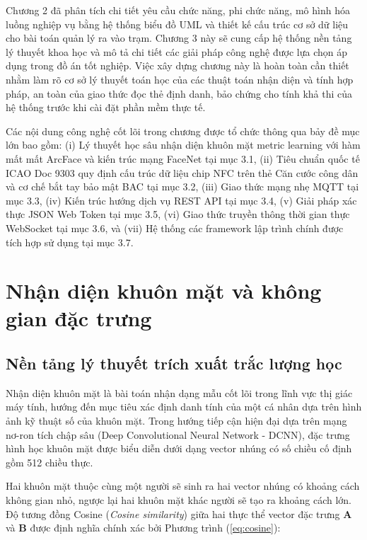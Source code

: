 ﻿\documentclass[../DoAn.tex]{subfiles}
\begin{document}
Chương 2 đã phân tích chi tiết yêu cầu chức năng, phi chức năng, mô hình hóa luồng nghiệp vụ bằng hệ thống biểu đồ UML và thiết kế cấu trúc cơ sở dữ liệu cho bài toán quản lý ra vào trạm. Chương 3 này sẽ cung cấp hệ thống nền tảng lý thuyết khoa học và mô tả chi tiết các giải pháp công nghệ được lựa chọn áp dụng trong đồ án tốt nghiệp. Việc xây dựng chương này là hoàn toàn cần thiết nhằm làm rõ cơ sở lý thuyết toán học của các thuật toán nhận diện và tính hợp pháp, an toàn của giao thức đọc thẻ định danh, bảo chứng cho tính khả thi của hệ thống trước khi cài đặt phần mềm thực tế. 

Các nội dung công nghệ cốt lõi trong chương được tổ chức thông qua bảy đề mục lớn bao gồm: (i) Lý thuyết học sâu nhận diện khuôn mặt metric learning với hàm mất mất ArcFace và kiến trúc mạng FaceNet tại mục 3.1, (ii) Tiêu chuẩn quốc tế ICAO Doc 9303 quy định cấu trúc dữ liệu chip NFC trên thẻ Căn cước công dân và cơ chế bắt tay bảo mật BAC tại mục 3.2, (iii) Giao thức mạng nhẹ MQTT tại mục 3.3, (iv) Kiến trúc hướng dịch vụ REST API tại mục 3.4, (v) Giải pháp xác thực JSON Web Token tại mục 3.5, (vi) Giao thức truyền thông thời gian thực WebSocket tại mục 3.6, và (vii) Hệ thống các framework lập trình chính được tích hợp sử dụng tại mục 3.7.

\section{Nhận diện khuôn mặt và không gian đặc trưng}
\label{section:3.1}

\subsection{Nền tảng lý thuyết trích xuất trắc lượng học}

Nhận diện khuôn mặt là bài toán nhận dạng mẫu cốt lõi trong lĩnh vực thị giác máy tính, hướng đến mục tiêu xác định danh tính của một cá nhân dựa trên hình ảnh kỹ thuật số của khuôn mặt. Trong hướng tiếp cận hiện đại dựa trên mạng nơ-ron tích chập sâu (Deep Convolutional Neural Network - DCNN), đặc trưng hình học khuôn mặt được biểu diễn dưới dạng vector nhúng có số chiều cố định gồm 512 chiều thực. 

Hai khuôn mặt thuộc cùng một người sẽ sinh ra hai vector nhúng có khoảng cách không gian nhỏ, ngược lại hai khuôn mặt khác người sẽ tạo ra khoảng cách lớn. Độ tương đồng Cosine (\textit{Cosine similarity}) giữa hai thực thể vector đặc trưng $\mathbf{A}$ và $\mathbf{B}$ được định nghĩa chính xác bởi Phương trình (\ref{eq:cosine}):
\end{document}
